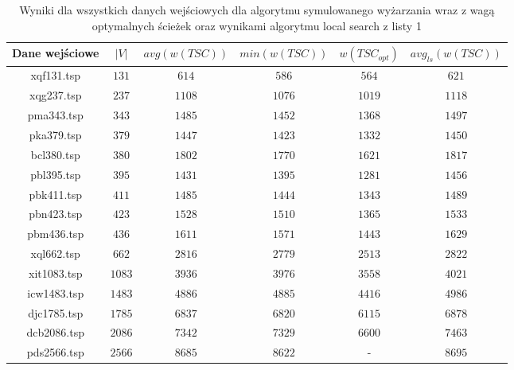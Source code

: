 \documentclass[12pt]{article}
\begin{document}
        \begin{table}[h!]
        \centering
        \begin{tabularx}{0.91\textwidth}{| c | c | c | c | c | c |}
            \hline
            Dane wejściowe & $|V|$ & $avg(w(TSC))$ & $min(w(TSC))$ & $w(TSC_{opt})$ & $avg_{ls}(w(TSC))$ \\
            \hline
            xqf131.tsp  & $131$  & $614$  & $586$  & $564$  & $621$ \\
            xqg237.tsp  & $237$  & $1108$ & $1076$ & $1019$ & $1118$ \\
            pma343.tsp  & $343$  & $1485$ & $1452$ & $1368$ & $1497$ \\
            pka379.tsp  & $379$  & $1447$ & $1423$ & $1332$ & $1450$ \\
            bcl380.tsp  & $380$  & $1802$ & $1770$ & $1621$ & $1817$ \\
            pbl395.tsp  & $395$  & $1431$ & $1395$ & $1281$ & $1456$ \\
            pbk411.tsp  & $411$  & $1485$ & $1444$ & $1343$ & $1489$ \\
            pbn423.tsp  & $423$  & $1528$ & $1510$ & $1365$ & $1533$ \\
            pbm436.tsp  & $436$  & $1611$ & $1571$ & $1443$ & $1629$ \\
            xql662.tsp  & $662$  & $2816$ & $2779$ & $2513$ & $2822$ \\
            xit1083.tsp & $1083$ & $3936$ & $3976$ & $3558$ & $4021$ \\
            icw1483.tsp & $1483$ & $4886$ & $4885$ & $4416$ & $4986$ \\
            djc1785.tsp & $1785$ & $6837$ & $6820$ & $6115$ & $6878$ \\
            dcb2086.tsp & $2086$ & $7342$ & $7329$ & $6600$ & $7463$ \\
            pds2566.tsp & $2566$ & $8685$ & $8622$ & -      & $8695$ \\
            \hline
        \end{tabularx}
        \label{table:ts_result}
        \caption{Wyniki dla wszystkich danych wejściowych dla algorytmu symulowanego wyżarzania wraz z
        wagą optymalnych ścieżek oraz wynikami algorytmu local search z listy 1}
        \end{table}

        \noindent\newline
\end{document}

